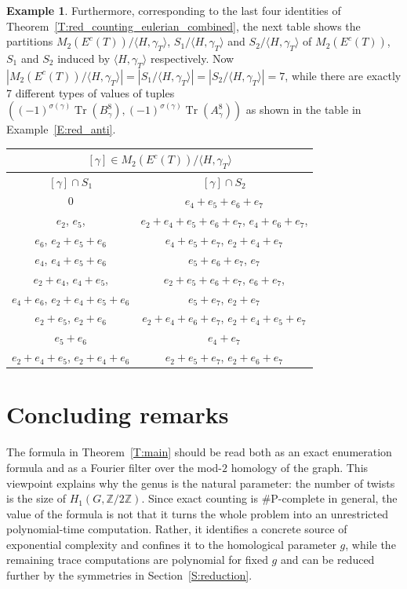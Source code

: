 \documentclass[11pt]{amsart}
\theoremstyle{plain}
\theoremstyle{definition}
\newtheorem{example}[theorem]{Example}
\newcommand{\mbbZ}{{\mathbb Z}}
\DeclareMathOperator{\trace}{\operatorname{Tr}}
\numberwithin{equation}{section}
\begin{document}
\begin{example}
Furthermore, corresponding to the last four identities of Theorem~\ref{T:red_counting_eulerian_combined}, the next table shows the partitions $M_2(E^c(T))/\langle H,\gamma_T\rangle$, $S_1/\langle H,\gamma_T\rangle$ and $S_2/\langle H,\gamma_T\rangle$  of $M_2(E^c(T))$, $S_1$ and $S_2$ induced by $\langle H,\gamma_T\rangle$ respectively. Now $|M_2(E^c(T))/\langle H,\gamma_T\rangle|=|S_1/\langle H,\gamma_T\rangle|=|S_2/\langle H,\gamma_T\rangle|=7$, while there are exactly 7 different types of values of tuples $\left((-1)^{\sigma(\gamma)}\trace\left(B_\gamma^8\right),(-1)^{\sigma(\gamma)}\trace\left(A_\gamma^8\right)\right)$ as shown in the table in  Example~\ref{E:red_anti}. 
\begin{center}
\begin{tabular}{|c|c|}
\hline
\multicolumn{2}{|c|}{$[\gamma]\in M_2(E^c(T))/\langle H,\gamma_T\rangle$} \\ \hline
$[\gamma]\cap S_1$& $[\gamma]\cap S_2$    \\ \hline 
0 & $e_4+e_5+e_6+e_7$  \\ \hline 
$e_2$, $e_5$,  & $e_2+e_4+e_5+e_6+e_7$, $e_4+ e_6 +e_7$, \\  
$e_6$,  $e_2+e_5+e_6$ & $e_4+e_5 +e_7$, $e_2+ e_4 +e_7$ \\  \hline
$e_4$, $e_4+e_5+e_6$   &  $e_5+e_6+e_7$,  $e_7$    \\ \hline
$e_2+e_4$,  $e_4+e_5$,  &  $e_2+e_5+ e_6 +e_7$, $e_6+e_7$,  \\ 
 $e_4+e_6$, $e_2+e_4+e_5+e_6$  & $e_5+e_7$,   $e_2+e_7$  \\ \hline
$e_2+e_5$, $e_2+e_6$  & $e_2+e_4+ e_6 +e_7$, $e_2+e_4+ e_5 +e_7$   \\ \hline
$e_5+e_6$ & $e_4+ e_7$   \\ \hline
$e_2+e_4+e_5$, $e_2+e_4+e_6$  & $e_2+e_5+e_7$, $e_2+e_6+e_7$ \\ \hline
\end{tabular}
\end{center}

\end{example}



\section{Concluding remarks}

The formula in Theorem~\ref{T:main} should be read both as an exact enumeration formula and as a Fourier filter over the mod-$2$ homology of the graph.  This viewpoint explains why the genus is the natural parameter: the number of twists is the size of $H_1(G,\mbbZ/2\mbbZ)$.  Since exact counting is \#P-complete in general, the value of the formula is not that it turns the whole problem into an unrestricted polynomial-time computation.  Rather, it identifies a concrete source of exponential complexity and confines it to the homological parameter $g$, while the remaining trace computations are polynomial for fixed $g$ and can be reduced further by the symmetries in Section~\ref{S:reduction}.
\end{document}
